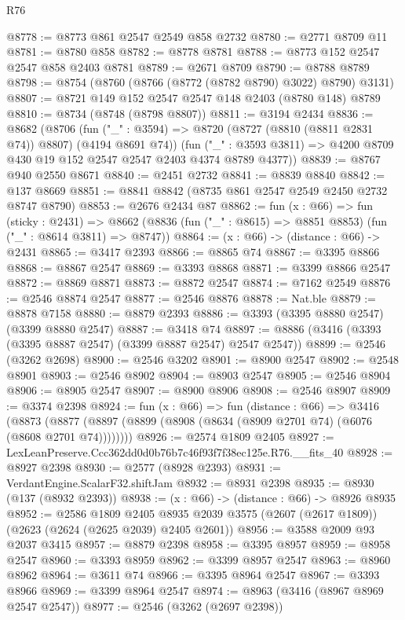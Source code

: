 \begin{lexlean}{R76}
\begin{coremodule}
@8778 := @8773 @861 @2547 @2549 @858 @2732
@8780 := @2771 @8709 @11
@8781 := @8780 @858
@8782 := @8778 @8781
@8788 := @8773 @152 @2547 @2547 @858 @2403 @8781
@8789 := @2671 @8709
@8790 := @8788 @8789
@8798 := @8754 (@8760 (@8766 (@8772 (@8782 @8790) @3022) @8790) @3131)
@8807 := @8721 @149 @152 @2547 @2547 @148 @2403 (@8780 @148) @8789
@8810 := @8734 (@8748 (@8798 @8807))
@8811 := @3194 @2434
@8836 := @8682
    (@8706
      (fun ("_" : @3594) => @8720 (@8727 (@8810 (@8811 @2831 @74)) @8807) (@4194 @8691 @74))
      (fun ("_" : @3593 @3811) => @4200 @8709 @430 @19 @152 @2547 @2547 @2403 @4374 @8789 @4377))
@8839 := @8767 @940 @2550 @8671
@8840 := @2451 @2732
@8841 := @8839 @8840
@8842 := @137 @8669
@8851 := @8841 @8842 (@8735 @861 @2547 @2549 @2450 @2732 @8747 @8790)
@8853 := @2676 @2434 @87
@8862 := fun (x : @66) =>
  fun (sticky : @2431) =>
  @8662 (@8836 (fun ("_" : @8615) => @8851 @8853) (fun ("_" : @8614 @3811) => @8747))
@8864 := (x : @66) -> (distance : @66) -> @2431
@8865 := @3417 @2393
@8866 := @8865 @74
@8867 := @3395 @8866
@8868 := @8867 @2547
@8869 := @3393 @8868
@8871 := @3399 @8866 @2547
@8872 := @8869 @8871
@8873 := @8872 @2547
@8874 := @7162 @2549
@8876 := @2546 @8874 @2547
@8877 := @2546 @8876
@8878 := Nat.ble
@8879 := @8878 @7158
@8880 := @8879 @2393
@8886 := @3393 (@3395 @8880 @2547) (@3399 @8880 @2547)
@8887 := @3418 @74
@8897 := @8886 (@3416 (@3393 (@3395 @8887 @2547) (@3399 @8887 @2547) @2547 @2547))
@8899 := @2546 (@3262 @2698)
@8900 := @2546 @3202
@8901 := @8900 @2547
@8902 := @2548 @8901
@8903 := @2546 @8902
@8904 := @8903 @2547
@8905 := @2546 @8904
@8906 := @8905 @2547
@8907 := @8900 @8906
@8908 := @2546 @8907
@8909 := @3374 @2398
@8924 := fun (x : @66) =>
  fun (distance : @66) =>
  @3416 (@8873 (@8877 (@8897 (@8899 (@8908 (@8634 (@8909 @2701 @74) (@6076 (@8608 @2701 @74))))))))
@8926 := @2574 @1809 @2405
@8927 := LexLeanPreserve.Ccc362dd0d0b76b7c46f93f7f38ec125e.R76.__fits_40
@8928 := @8927 @2398
@8930 := @2577 (@8928 @2393)
@8931 := VerdantEngine.ScalarF32.shiftJam
@8932 := @8931 @2398
@8935 := @8930 (@137 (@8932 @2393))
@8938 := (x : @66) -> (distance : @66) -> @8926 @8935
@8952 := @2586
    @1809
    @2405
    @8935
    @2039
    @3575
    (@2607 (@2617 @1809))
    (@2623 (@2624 (@2625 @2039) @2405 @2601))
@8956 := @3588 @2009 @93 @2037 @3415
@8957 := @8879 @2398
@8958 := @3395 @8957
@8959 := @8958 @2547
@8960 := @3393 @8959
@8962 := @3399 @8957 @2547
@8963 := @8960 @8962
@8964 := @3611 @74
@8966 := @3395 @8964 @2547
@8967 := @3393 @8966
@8969 := @3399 @8964 @2547
@8974 := @8963 (@3416 (@8967 @8969 @2547 @2547))
@8977 := @2546 (@3262 (@2697 @2398))

\end{coremodule}
\end{lexlean}

